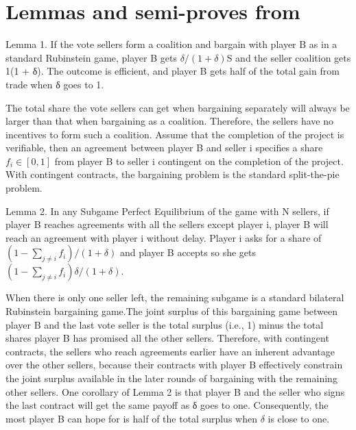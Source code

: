 \documentclass[\econtexRoot/ProjectGAZ]{subfiles}
\begin{document}
	\hypertarget{ApndxCai03}{}

	\section{Lemmas and semi-proves from \cite{Cai03}}
		
	Lemma 1. If the vote sellers form a coalition and bargain with player B as in a standard Rubinstein game, player B gets $\delta/(1 + \delta)$S and the seller coalition gets 1(1 + δ). The outcome is efficient, and player B gets half of the total gain from trade when δ goes to 1.
	
	The total share the vote sellers can get when bargaining separately will always be larger than that when bargaining as a coalition. Therefore, the sellers have no incentives to form such a coalition.
	Assume that the completion of the project is verifiable, then an agreement between player B and seller i specifies a share $f_i \in [0, 1]$ from player B to seller i contingent on the completion of the project. With contingent contracts, the bargaining problem is the standard split-the-pie problem.
	
	Lemma 2. In any Subgame Perfect Equilibrium of the game with N sellers, if player B reaches agreements with all the sellers except player i, player B will reach an agreement with player i without delay. Player i asks for a share of $(1 - \sum_{j \neq i} f_i)/(1 + \delta)$ and player B accepts so she gets $(1 - \sum_{j \neq i} f_i)\delta /(1 + \delta)$.
	
	When there is only one seller left, the remaining subgame is a standard bilateral Rubinstein bargaining game.The joint surplus of this bargaining game between player B and the last vote seller is the total surplus (i.e., 1) minus the total shares player B has promised all the other sellers. Therefore, with contingent contracts, the sellers who reach agreements earlier have an inherent advantage over the other sellers, because their contracts with player B effectively constrain the joint surplus available in the later rounds of bargaining with the remaining other sellers.
	One corollary of Lemma 2 is that player B and the seller who signs the last contract will get the same payoff as δ goes to one. Consequently, the most player B can hope for is half of the total surplus when $\delta$ is close to one.

\onlyinsubfile{\pagebreak}
\end{document}
